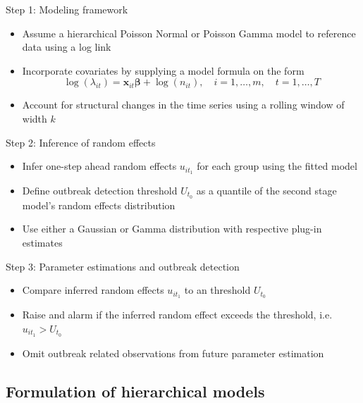 \documentclass[aspectratio=169,handout]{beamer}
\begin{document}
\begin{frame}{Step 1: Modeling framework}
\protect\hypertarget{step-1-modeling-framework}{}
\begin{itemize}
  \item Assume a hierarchical Poisson Normal or Poisson Gamma model to reference data using a log link
  \item Incorporate covariates by supplying a model formula on the form
  \begin{equation}
    \log(\lambda_{it})=\boldsymbol x_{it}\boldsymbol \beta+\log(n_{it}), \quad i=1,\dots,m, \quad t=1,\dots,T
  \end{equation}
  \item Account for structural changes in the time series using a rolling window of width $k$
\end{itemize}
\end{frame}

\begin{frame}{Step 2: Inference of random effects}
\protect\hypertarget{step-2-inference-of-random-effects}{}
\begin{itemize}
  \item Infer one-step ahead random effects $u_{i{t_1}}$ for each group using the fitted model
  \item Define outbreak detection threshold $U_{t_0}$ as a quantile of the second stage model's random effects distribution
  \item Use either a Gaussian or Gamma distribution with respective plug-in estimates
\end{itemize}
\end{frame}

\begin{frame}{Step 3: Parameter estimations and outbreak detection}
\protect\hypertarget{step-3-parameter-estimations-and-outbreak-detection}{}
\begin{itemize}
  \item Compare inferred random effects $u_{i{t_1}}$ to an threshold $U_{t_0}$
  \item Raise and alarm if the inferred random effect exceeds the threshold, i.e. $u_{i{t_1}}>U_{t_0}$
  \item Omit outbreak related observations from future parameter estimation
\end{itemize}
\end{frame}

\hypertarget{formulation-of-hierarchical-models}{%
\subsection{Formulation of hierarchical
models}\label{formulation-of-hierarchical-models}}
\end{document}
